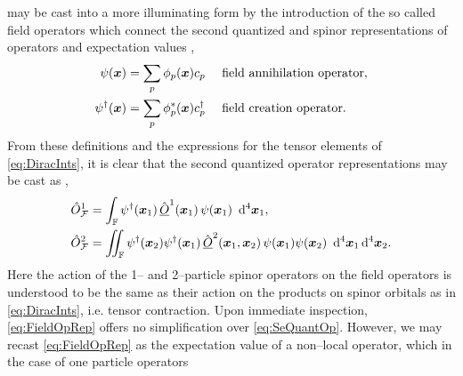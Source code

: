  may be cast into a more illuminating form by the introduction of the so called field operators which connect
the second quantized and spinor representations of operators and expectation values \cite{Walecka12_book,Schuck04_book,Yang89_book,Ohrn73_book},
\begin{subequations}
\label{eq:FieldOperators}
\begin{align}
\psi (\boldsymbol{x}) = \sum_p \phi_p(\boldsymbol{x}) c_p &\quad \text{ field annihilation operator},\\
\psi^\dagger(\boldsymbol{x}) = \sum_p \phi^*_p(\boldsymbol{x}) c^\dagger_p &\quad \text{ field creation operator}.
\end{align}
\end{subequations}
From these definitions and the expressions for the tensor elements of \cref{eq:DiracInts}, it is clear
that the second quantized operator representations may be cast as \cite{Walecka12_book,Yang89_book},
\begin{subequations}
\label{eq:FieldOpRep}
\begin{align}
  &\hat{O}_{\mathcal{F}}^1 = \int_{\mathbb F} \psi^\dagger(\boldsymbol{x}_1) \,\hat{\underline{O}}^1(\boldsymbol{x}_1) \,\psi(\boldsymbol{x}_1) \,\,\,\mathrm{d}^4 \boldsymbol{x}_1, \\
  &\hat{O}_{\mathcal{F}}^2 = \int\mkern-12mu\int_{\mathbb F} \psi^\dagger(\boldsymbol{x}_2)\psi^\dagger(\boldsymbol{x}_1) \,\hat{\underline{O}}^2(\boldsymbol{x}_1,\boldsymbol{x}_2) \,\psi(\boldsymbol{x}_1)\psi(\boldsymbol{x}_2) 
    \,\,\,\mathrm{d}^4 \boldsymbol{x}_1\,\mathrm{d}^4 \boldsymbol{x}_2.
\end{align}
\end{subequations}
Here the action of the 1-- and 2--particle spinor operators on the field operators is understood to be the same
as their action on the products on spinor orbitals as in \cref{eq:DiracInts}, i.e. tensor contraction. Upon immediate
inspection, \cref{eq:FieldOpRep} offers no simplification over \cref{eq:SeQuantOp}. However, we may recast 
\cref{eq:FieldOpRep} as the expectation value of a non--local operator, which in the case of one particle operators
